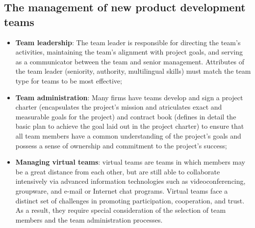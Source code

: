\documentclass[12pt]{article}
\begin{document}
\subsection{The management of new product development teams}
\begin{itemize}
    \item \textbf{Team leadership}: The team leader is responsible for directing the team's activities, maintaining the team's
    alignment with project goals, and serving as a communicator between the team and senior management.
    Attributes of the team leader (seniority, authority, multilingual skills) must match the team type for teams to be most effective;
    \item \textbf{Team administration}: Many firms have teams develop and sign a project charter (encapsulates the project's mission and atriculates exact and measurable goals for the project) and contract book (defines in detail the basic plan
    to achieve the goal laid out in the project charter) to ensure that all team members have a common understanding of the project's goals and possess a sense of ownership and commitment to the project's success;
    \item \textbf{Managing virtual teams}: virtual teams are teams in which members may be a great distance from each other, but are still able to collaborate intensively via advanced information technologies such as videoconferencing, groupware, and e-mail or Internet chat programs. Virtual teams face a distinct set of challenges in promoting participation, cooperation, and trust. As a result, they require special consideration of the selection of
    team members and the team administration processes.
\end{itemize}
\end{document}
